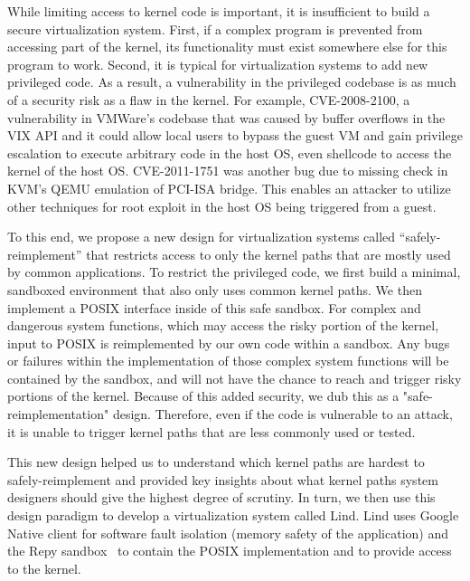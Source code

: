 While limiting access to kernel code is important, it is
insufficient to build a secure virtualization system.  First, if a complex
program is prevented from accessing part of the kernel, its functionality 
must exist somewhere else for this program to work.  Second, it is 
typical for virtualization systems to add new privileged code.
As a result, a vulnerability in the privileged codebase is as much of a security 
risk as a flaw in the kernel.  %
For example, CVE-2008-2100, a vulnerability in VMWare's codebase that was caused by buffer overflows 
in the VIX API and it could allow local users to bypass the guest VM and gain privilege escalation to execute arbitrary code 
in the host OS, even shellcode to access the kernel of the host OS. CVE-2011-1751 was another bug due to 
missing check in KVM's QEMU emulation of PCI-ISA bridge. This enables an attacker to utilize other techniques \cite{Virtunoid} 
for root exploit in the host OS being triggered from a guest.  


To this end, we propose a new design for virtualization 
systems called ``safely-reimplement'' that restricts access to only the
kernel paths that are mostly used by common applications.  To restrict the privileged
code, we first build a minimal, sandboxed environment that also only uses 
common kernel paths.
We then implement a POSIX interface inside of this safe sandbox. For complex and dangerous system functions, 
which may access the risky portion of the kernel, 
input to POSIX is reimplemented by our own code within a sandbox. Any bugs or failures within the implementation of 
those complex system functions 
will be contained by the sandbox, and will not have the chance to reach 
and trigger risky portions of the kernel. Because of this added security, we dub this as a "safe-reimplementation" design. 
Therefore, even if the code
is vulnerable to an attack, it is unable to trigger
kernel paths that are less commonly used or tested.

This new design helped us to understand which kernel paths are hardest to
safely-reimplement and provided key insights about what kernel paths system
designers should give the highest degree of scrutiny. In turn, we then use this design paradigm to develop 
a virtualization system called
Lind.  Lind uses Google Native client for software fault isolation (memory
safety of the application) and the Repy sandbox~\cite{Repy-10} to contain the POSIX
implementation and to provide access to the kernel.

